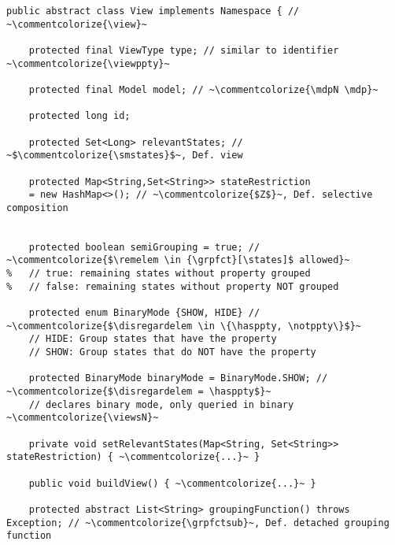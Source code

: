 \documentclass[preview]{standalone}
\begin{document}
	\begin{lstlisting}[style=javaStyle, caption={Most relevant attributes and methods of class \texttt{View}}, label={lst:classview}]
public abstract class View implements Namespace { // ~\commentcolorize{\view}~
	
	protected final ViewType type; // similar to identifier ~\commentcolorize{\viewppty}~
	
	protected final Model model; // ~\commentcolorize{\mdpN \mdp}~
	
	protected long id; 
	
	protected Set<Long> relevantStates; // ~$\commentcolorize{\smstates}$~, Def. view
	
	protected Map<String,Set<String>> stateRestriction 
	= new HashMap<>(); // ~\commentcolorize{$Z$}~, Def. selective composition

	
	protected boolean semiGrouping = true; // ~\commentcolorize{$\remelem \in {\grpfct}[\states]$ allowed}~
%	// true: remaining states without property grouped
%	// false: remaining states without property NOT grouped
	
	protected enum BinaryMode {SHOW, HIDE} // ~\commentcolorize{$\disregardelem \in \{\hasppty, \notppty\}$}~
	// HIDE: Group states that have the property 
	// SHOW: Group states that do NOT have the property
	
	protected BinaryMode binaryMode = BinaryMode.SHOW; // ~\commentcolorize{$\disregardelem = \hasppty$}~
	// declares binary mode, only queried in binary ~\commentcolorize{\viewsN}~
	
	private void setRelevantStates(Map<String, Set<String>> stateRestriction) { ~\commentcolorize{...}~ }
	
	public void buildView() { ~\commentcolorize{...}~ }
		
	protected abstract List<String> groupingFunction() throws Exception; // ~\commentcolorize{\grpfctsub}~, Def. detached grouping function
	
	

\end{lstlisting}
	
\end{document}
